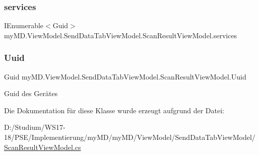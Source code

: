 \subsubsection{\texorpdfstring{services}{services}}
{\footnotesize\ttfamily I\+Enumerable$<$Guid$>$ my\+M\+D.\+View\+Model.\+Send\+Data\+Tab\+View\+Model.\+Scan\+Result\+View\+Model.\+services\hspace{0.3cm}{\ttfamily [get]}}

\mbox{\label{classmy_m_d_1_1_view_model_1_1_send_data_tab_view_model_1_1_scan_result_view_model_a85f6973e1fc06fbbf200988d583fdb01}} 
\subsubsection{\texorpdfstring{Uuid}{Uuid}}
{\footnotesize\ttfamily Guid my\+M\+D.\+View\+Model.\+Send\+Data\+Tab\+View\+Model.\+Scan\+Result\+View\+Model.\+Uuid\hspace{0.3cm}{\ttfamily [get]}}



Guid des Gerätes 



Die Dokumentation für diese Klasse wurde erzeugt aufgrund der Datei\+:\begin{DoxyCompactItemize}
\item 
D\+:/\+Studium/\+W\+S17-\/18/\+P\+S\+E/\+Implementierung/my\+M\+D/my\+M\+D/\+View\+Model/\+Send\+Data\+Tab\+View\+Model/\mbox{\hyperlink{_scan_result_view_model_8cs}{Scan\+Result\+View\+Model.\+cs}}\end{DoxyCompactItemize}
